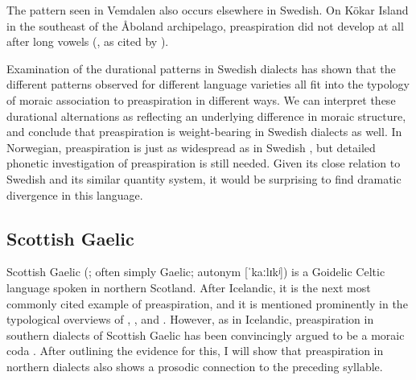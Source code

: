 \documentclass[output=paper,colorlinks,citecolor=brown]{langscibook}
\begin{document}
The pattern seen in Vemdalen also occurs elsewhere in Swedish. On Kökar Island in the southeast of the Åboland archipelago, preaspiration did not develop at all after long vowels (\citealp{karsten1892}, as cited by \citealp{Helgason2002}).

Examination of the durational patterns in Swedish dialects has shown that the different patterns observed for different language varieties all fit into the typology of moraic association to preaspiration in different ways. We can interpret these durational alternations as reflecting an underlying difference in moraic structure, and conclude that preaspiration is weight-bearing in Swedish dialects as well. In Norwegian, preaspiration is just as widespread as in Swedish \citep{Helgason2002,iosad2018}, but detailed phonetic investigation of preaspiration is still needed. Given its close relation to Swedish and its similar quantity system, it would be surprising to find dramatic divergence in this language.



\subsection{Scottish Gaelic}
\label{sec-gaelic}


Scottish Gaelic (; often simply Gaelic; autonym  [ˈkaːlɪkʲ]) is a Goidelic Celtic language spoken in northern Scotland. After Icelandic, it is the next most commonly cited example of preaspiration, and it is mentioned prominently in the typological overviews of \citet{Helgason2002}, \citet{Silverman2003}, and \citet{Clayton:2010}. However, as in Icelandic, preaspiration in southern dialects of Scottish Gaelic has been convincingly argued to be a moraic coda \citep{iosadetal2015}. After outlining the evidence for this, I will show that preaspiration in northern dialects also shows a prosodic connection to the preceding syllable.
\end{document}
